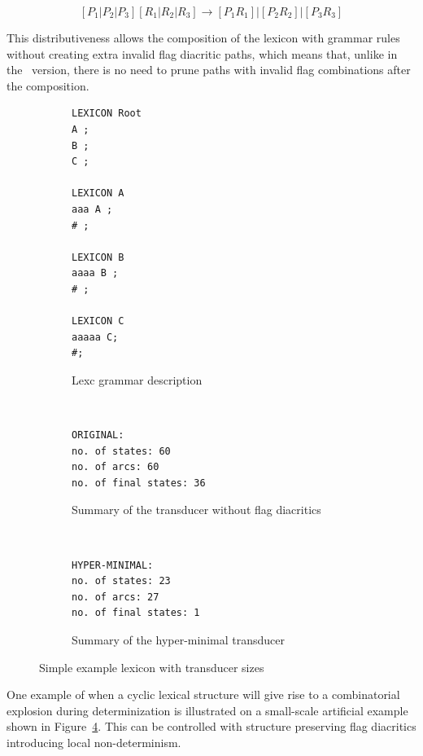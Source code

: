 \documentclass[11pt]{article}
\begin{document}
\begin{equation}\label{hub_replacement}
[P_1 | P_2 | P_3] [R_1 | R_2 | R_3] \rightarrow [P_1 R_1] | [P_2 R_2] | [P_3 R_3]
\end{equation}

This distributiveness allows 
the composition of the lexicon with grammar rules without creating extra invalid flag diacritic paths, which means that, 
unlike in the~ version, there is no need to prune paths with invalid flag combinations after the composition.

\begin{figure}[htbp]
    \centering
\begin{subfigure}[t]{0.3\textwidth}
\begin{verbatim}
LEXICON Root
A ;
B ;
C ;

LEXICON A
aaa A ;
# ;

LEXICON B
aaaa B ;
# ;

LEXICON C
aaaaa C;
#;
\end{verbatim}
\caption{Lexc grammar description
\label{fig:lexc-a2}}
\end{subfigure}
 ~ %
\begin{subfigure}[t]{0.3\textwidth}
\begin{verbatim}
ORIGINAL:
no. of states: 60
no. of arcs: 60
no. of final states: 36
\end{verbatim}
\caption{Summary of the transducer without flag diacritics
\label{fig:sizes-orig}}
\end{subfigure}%
 ~ %
\begin{subfigure}[t]{0.3\textwidth}
\begin{verbatim}
HYPER-MINIMAL:
no. of states: 23
no. of arcs: 27
no. of final states: 1
\end{verbatim}
\caption{Summary of the hyper-minimal transducer
\label{fig:sizes-flags}}
 \end{subfigure}
 \caption{Simple example lexicon with transducer sizes}
 \label{fig:simple-ex}
\end{figure}


One example of when a cyclic lexical structure will give rise to a combinatorial explosion during determinization is illustrated on a small-scale artificial example shown in Figure~\ref{fig:simple-ex}. This can be controlled with structure preserving flag diacritics introducing local non-determinism.
 
\end{document}
